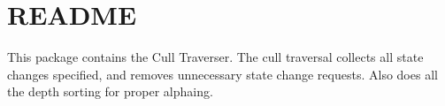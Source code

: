 \chapter{README}
\hypertarget{md_panda_2src_2cull_2README}{}\label{md_panda_2src_2cull_2README}
This package contains the Cull Traverser. The cull traversal collects all state changes specified, and removes unnecessary state change requests. Also does all the depth sorting for proper alphaing. 